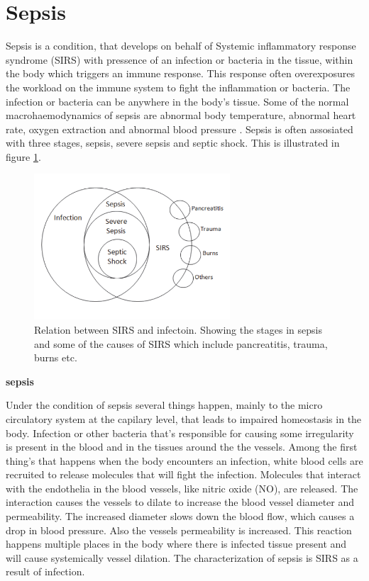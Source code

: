 \section{Sepsis}

Sepsis is a condition, that develops on behalf of Systemic inflammatory response syndrome (SIRS) with pressence of an infection or bacteria in the tissue, within the body which triggers an immune response. This response often overexposures the workload on the immune system to fight the inflammation or bacteria. The infection or bacteria can be anywhere in the body’s tissue. Some of the normal macrohaemodynamics of sepsis are abnormal body temperature, abnormal heart rate, oxygen extraction and abnormal blood pressure \cite{plunta2010,kanta2014}.
Sepsis is often assosiated with three stages, sepsis, severe sepsis and septic shock. This is illustrated in figure \ref{fig:Sepsis_stages}.

\begin{figure}[H]
	\centering	\includegraphics[width=0.65\textwidth]{figures/Sepsis_stages}
	\caption{Relation between SIRS and infectoin. Showing the stages in sepsis and some of the causes of SIRS which include pancreatitis, trauma, burns etc.}
	\label{fig:Sepsis_stages}
\end{figure} \vspace{-.3cm}

\textbf{sepsis}

Under the condition of sepsis several things happen, mainly to the micro circulatory system at the capilary level, that leads to impaired homeostasis in the body. Infection or other bacteria that’s responsible for causing some irregularity is present in the blood and in the tissues around the the vessels. Among the first thing’s that happens when the body encounters an infection, white blood cells are recruited to release molecules that will fight the infection. Molecules that interact with the endothelia in the blood vessels, like nitric oxide (NO), are released. The interaction causes the vessels to dilate to increase the blood vessel diameter and permeability. The increased diameter slows down the blood flow, which causes a drop in blood pressure. Also the vessels permeability is increased. This reaction happens multiple places in the body where there is infected tissue present and will cause systemically vessel dilation. The characterization of sepsis is SIRS as a result of infection. \cite{baudouin200,kanta2014}

